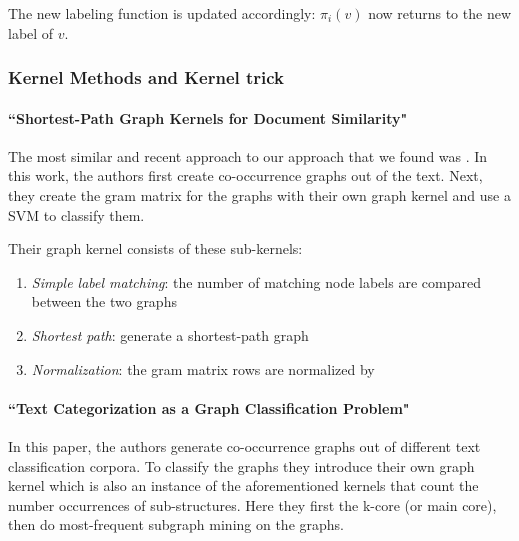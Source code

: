 The new labeling function is updated accordingly: $\pi_i(v)$ now returns to the new label of $v$.



\subsubsection{Kernel Methods and Kernel trick}


\paragraph{``Shortest-Path Graph Kernels for Document Similarity" \cite{Nikolentzos2017a}}
The most similar and recent approach to our approach that we found was \cite{Nikolentzos2017a}. In this work, the authors first create co-occurrence graphs out of the text. Next, they create the gram matrix for the graphs with their own graph kernel and use a SVM to classify them.

Their graph kernel consists of these sub-kernels:
\begin{enumerate}
\item{\textit{Simple label matching}: the number of matching node labels are compared between the two graphs}
\item{\textit{Shortest path}: generate a shortest-path graph}
\item{\textit{Normalization}: the gram matrix rows are normalized by }
\end{enumerate}

\paragraph{``Text Categorization as a Graph Classification Problem" \cite{Rousseau2015a}}
In this paper, the authors generate co-occurrence graphs out of different text classification corpora.
To classify the graphs they introduce their own graph kernel which is also an instance of the aforementioned kernels that count the number occurrences of sub-structures.
Here they first the k-core (or main core), then do most-frequent subgraph mining on the graphs.


